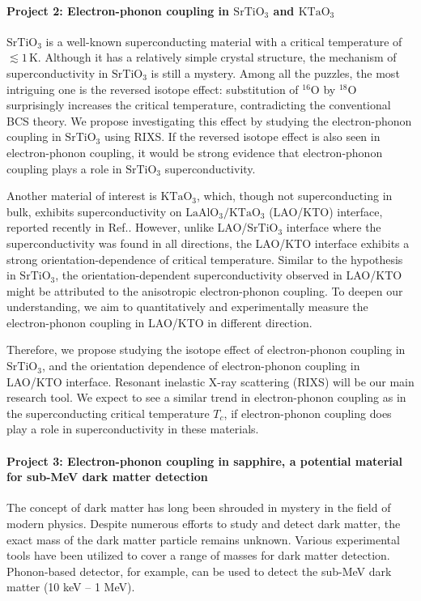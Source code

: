 \documentclass[11pt]{article}
\begin{document}
\paragraph{Project 2: Electron-phonon coupling in $\mathrm{SrTiO_{3}}$ and $\mathrm{KTaO_{3}}$} 
$\mathrm{SrTiO_{3}}$ is a well-known superconducting material with a critical temperature of $\lesssim 1\, \mathrm{K}$\cite{schooley_superconductivity_1964,lin_fermi_2013}. Although it has a relatively simple crystal structure, the mechanism of superconductivity in $\mathrm{SrTiO_{3}}$ is still a mystery. Among all the puzzles, the most intriguing one is the reversed isotope effect: substitution of ${}^{16}\mathrm{O}$ by ${}^{18}\mathrm{O}$ surprisingly increases the critical temperature, contradicting the conventional BCS theory\cite{stucky_isotope_2016}. We propose investigating this effect by studying the electron-phonon coupling in $\mathrm{SrTiO_{3}}$ using RIXS. If the reversed isotope effect is also seen in electron-phonon coupling, it would be strong evidence that electron-phonon coupling plays a role in $\mathrm{SrTiO_{3}}$ superconductivity.

Another material of interest is $\mathrm{KTaO_{3}}$, which, though not superconducting in bulk, exhibits superconductivity on $\mathrm{LaAlO_{3}/KTaO_{3}}$ (LAO/KTO) interface, reported recently in Ref.\cite{ren_two-dimensional_2022}. However, unlike LAO/$\mathrm{SrTiO_{3}}$ interface where the superconductivity was found in all directions, the LAO/KTO interface exhibits a strong orientation-dependence of critical temperature\cite{ren_two-dimensional_2022,chen_two-dimensional_2021}. Similar to the hypothesis in $\mathrm{SrTiO_{3}}$, the orientation-dependent superconductivity observed in LAO/KTO might be attributed to the anisotropic electron-phonon coupling. To deepen our understanding, we aim to quantitatively and experimentally measure the electron-phonon coupling in LAO/KTO in different direction.


Therefore, we propose studying the isotope effect of electron-phonon coupling in $\mathrm{SrTiO_{3}}$, and the orientation dependence of electron-phonon coupling in LAO/KTO interface. Resonant inelastic X-ray scattering (RIXS) will be our main research tool. We expect to see a similar trend in electron-phonon coupling as in the superconducting critical temperature $T_{c}$, if electron-phonon coupling does play a role in superconductivity in these materials.



\paragraph{Project 3: Electron-phonon coupling in sapphire, a potential material for sub-MeV dark matter detection}
The concept of dark matter has long been shrouded in mystery in the field of modern physics. Despite numerous efforts to study and detect dark matter\cite{bergstrom_non-baryonic_2000,vogel_dark_2014,essig_first_2012,davidson_updated_2000}, the exact mass of the dark matter particle remains unknown. Various experimental tools have been utilized to cover a range of masses for dark matter detection. Phonon-based detector, for example, can be used to detect the sub-MeV dark matter (10 keV -- 1 MeV).
  
\end{document}
